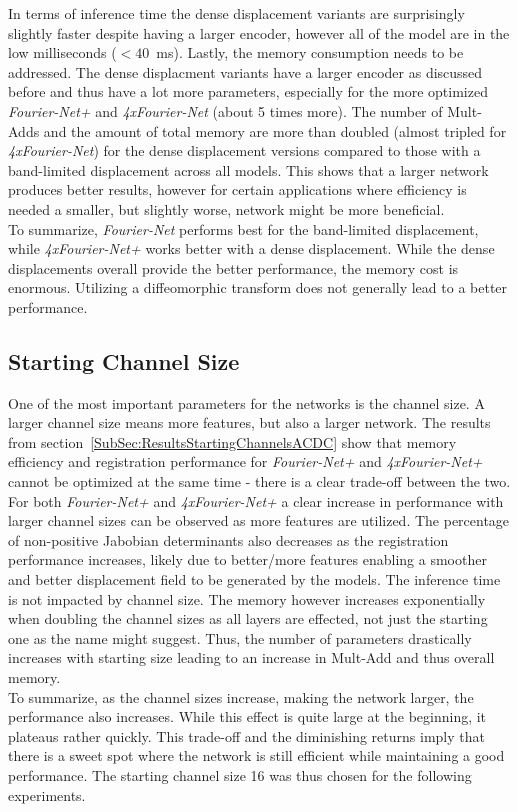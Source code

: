 In terms of inference time the dense displacement variants are surprisingly slightly faster despite having a larger encoder, however all of the model are in the low milliseconds ($<40$~ms). Lastly, the memory consumption needs to be addressed. The dense displacment variants have a larger encoder as discussed before and thus have a lot more parameters, especially for the more optimized \emph{Fourier-Net+} and \emph{4xFourier-Net} (about 5 times more). The number of Mult-Adds and the amount of total memory are more than doubled (almost tripled for \emph{4xFourier-Net}) for the dense displacement versions compared to those with a band-limited displacement across all models. This shows that a larger network produces better results, however for certain applications where efficiency is needed a smaller, but slightly worse, network might be more beneficial.\\
To summarize, \emph{Fourier-Net} performs best for the band-limited displacement, while \emph{4xFourier-Net+} works better with a dense displacement. While the dense displacements overall provide the better performance, the memory cost is enormous. Utilizing a diffeomorphic transform does not generally lead to a better performance.

\subsection{Starting Channel Size} \label{SubSec:DiscussionStartingChannelsACDC}
One of the most important parameters for the networks is the channel size. A larger channel size means more features, but also a larger network. The results from section~\ref{SubSec:ResultsStartingChannelsACDC} show that memory efficiency and registration performance for \emph{Fourier-Net+} and \emph{4xFourier-Net+} cannot be optimized at the same time - there is a clear trade-off between the two. For both \emph{Fourier-Net+} and \emph{4xFourier-Net+} a clear increase in performance with larger channel sizes can be observed as more features are utilized. The percentage of non-positive Jabobian determinants also decreases as the registration performance increases, likely due to better/more features enabling a smoother and better displacement field to be generated by the models. The inference time is not impacted by channel size. The memory however increases exponentially when doubling the channel sizes as all layers are effected, not just the starting one as the name might suggest. Thus, the number of parameters drastically increases with starting size leading to an increase in Mult-Add and thus overall memory. \\
To summarize, as the channel sizes increase, making the network larger, the performance also increases. While this effect is quite large at the beginning, it plateaus rather quickly. This trade-off and the diminishing returns imply that there is a sweet spot where the network is still efficient while maintaining a good performance. The starting channel size 16 was thus chosen for the following experiments.

